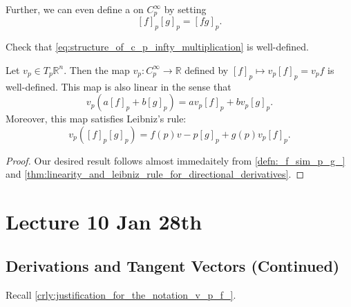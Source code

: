\documentclass[notoc,notitlepage]{tufte-book}
\begin{document}
Further, we can even define a  on $C_p^{\infty}$ by setting
\begin{equation}\label{eq:structure_of_c_p_infty_multiplication}
  [f]_p [g]_p = [fg]_p.
\end{equation}

\begin{eg}
  Check that \cref{eq:structure_of_c_p_infty_multiplication} is well-defined.
\end{eg}

\begin{propo}\label{propo:linearity_of_the_directional_derivative_over_the_germs_of_functions}
  Let $v_p \in T_p \mathbb{R}^n$. Then the map $v_p : C_p^{\infty} \to \mathbb{R}$
  defined by $[f]_p \mapsto v_p [f]_p = v_p f$ is well-defined. This map is also
  linear in the sense that
  \begin{equation*}
    v_p(a[f]_p + b[g]_p) = a v_p [f]_p + b v_p [g]_p.
  \end{equation*}
  Moreover, this map satisfies Leibniz's rule:
  \begin{equation*}
    v_p([f]_p [g]_p) = f(p) v-p [g]_p + g(p) v_p [f]_p.
  \end{equation*}
\end{propo}

\begin{proof}
  Our desired result follows almost immedaitely from \cref{defn:_f_sim_p_g_} and
  \cref{thm:linearity_and_leibniz_rule_for_directional_derivatives}.
\end{proof}



\chapter{Lecture 10 Jan 28th}%
\label{chp:lecture_10_jan_28th}

\section{Derivations and Tangent Vectors (Continued)}%
\label{sec:derivations_and_tangent_vectors_continued}

Recall \cref{crly:justification_for_the_notation_v_p_f_}.
\end{document}
